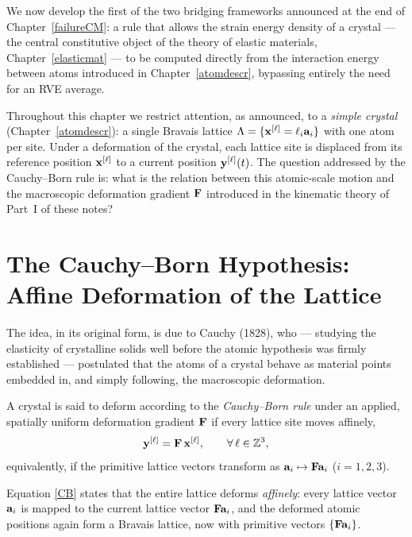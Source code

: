 We now develop the first of the two bridging frameworks announced at the end of Chapter~\ref{failureCM}: a rule that allows the strain energy density of a crystal --- the central constitutive object of the theory of elastic materials, Chapter~\ref{elasticmat} --- to be computed directly from the interaction energy between atoms introduced in Chapter~\ref{atomdescr}, bypassing entirely the need for an RVE average.

Throughout this chapter we restrict attention, as announced, to a \textit{simple crystal} (Chapter~\ref{atomdescr}): a single Bravais lattice $\Lambda=\{\mathbf{x}^{[\ell]}=\ell_i\mathbf{a}_i\}$ with one atom per site. Under a deformation of the crystal, each lattice site is displaced from its reference position $\mathbf{x}^{[\ell]}$ to a current position $\mathbf{y}^{[\ell]}(t)$. The question addressed by the Cauchy--Born rule is: what is the relation between this atomic-scale motion and the macroscopic deformation gradient $\mathbf{F}$ introduced in the kinematic theory of Part~I of these notes?

\section{The Cauchy--Born Hypothesis: Affine Deformation of the Lattice}

The idea, in its original form, is due to Cauchy (1828), who --- studying the elasticity of crystalline solids well before the atomic hypothesis was firmly established --- postulated that the atoms of a crystal behave as material points embedded in, and simply following, the macroscopic deformation.

\begin{definition}\label{def:CB}
	A crystal is said to deform according to the \textit{Cauchy--Born rule} under an applied, spatially uniform deformation gradient $\mathbf{F}$ if every lattice site moves affinely,
	\begin{equation}\label{CB}
		\mathbf{y}^{[\ell]} = \mathbf{F}\,\mathbf{x}^{[\ell]}, \qquad \forall\,\ell\in\mathbb{Z}^3,
	\end{equation}
	equivalently, if the primitive lattice vectors transform as $\mathbf{a}_i\mapsto\mathbf{F}\mathbf{a}_i$ ($i=1,2,3$).
\end{definition}

Equation \eqref{CB} states that the entire lattice deforms \textit{affinely}: every lattice vector $\mathbf{a}_i$ is mapped to the current lattice vector $\mathbf{F}\mathbf{a}_i$, and the deformed atomic positions again form a Bravais lattice, now with primitive vectors $\{\mathbf{F}\mathbf{a}_i\}$.

